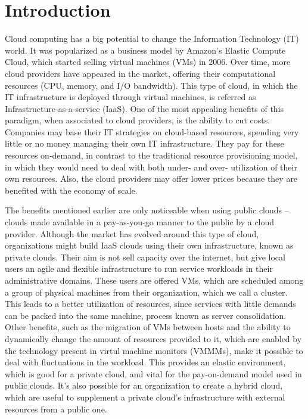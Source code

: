 \chapter{\textbf{Introduction}}

\label{Introduction}

Cloud computing has a big potential to change the Information Technology (IT) world. It was popularized as a business model by Amazon's Elastic Compute Cloud, which started selling virtual machines (VMs) in 2006. Over time, more cloud providers have appeared in the market, offering their computational resources (CPU, memory, and I/O bandwidth). This type of cloud, in which the IT infrastructure is deployed through virtual machines, is referred as Infrastructure-as-a-service (IaaS). One of the most appealing benefits of this paradigm, when associated to cloud providers, is the ability to cut costs. Companies may base their IT strategies on cloud-based resources, spending very little or no money managing their own IT infrastructure. They pay for these resources on-demand, in contrast to the traditional resource provisioning model, in which they would need to deal with both under- and over- utilization of their own resources. Also, the cloud providers may offer lower prices because they are benefited with the economy of scale.


The benefits mentioned earlier are only noticeable when using public clouds -- clouds made available in a pay-as-you-go manner to the public by a cloud provider. Although the market has evolved around this type of cloud, organizations might build IaaS clouds using their own infrastructure, known as private clouds. Their aim is not sell capacity  over the internet,  but give local users an agile and flexible infrastructure to run service workloads in their administrative domains. These users are offered VMs, which are scheduled among a group of physical machines from their organization, which we call a cluster. This leads to a better utilization of resources, since services with little demands can be packed into the same machine, process known as server consolidation. Other benefits, such as the migration of VMs between hosts and the ability to dynamically change the amount of resources provided to it, which are enabled by the  technology present in virtul machine monitors (VMMMs), make it possible to deal with fluctuations in the workload. This provides an elastic environment, which is good for a private cloud, and vital for the pay-on-demand model used in public clouds.  It's also possible for an organization to create a hybrid cloud,  which are useful to supplement a private cloud's infrastructure with external resources from a public one. 

